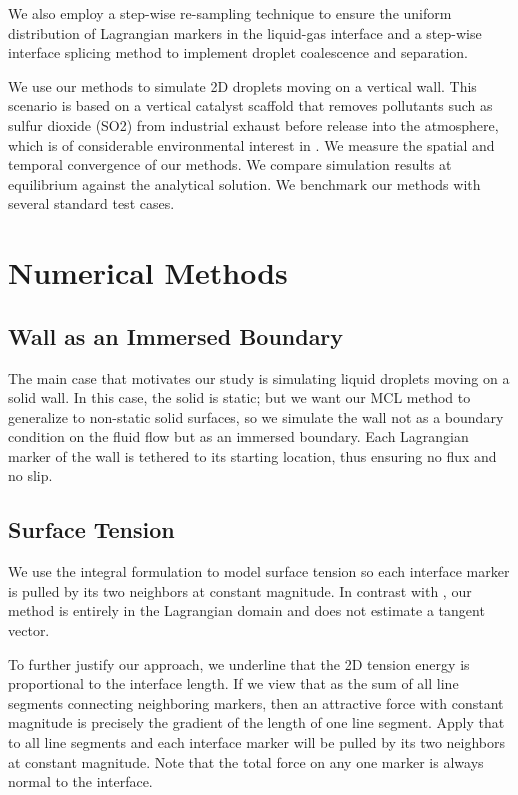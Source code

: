 \documentclass{jfm}
\newcommand{\daniel}[1]{\todo[inline,color=yellow!40]{Daniel: #1}}
\begin{document}
We also employ a step-wise re-sampling technique to ensure the uniform distribution of Lagrangian markers in the liquid-gas interface and a step-wise interface splicing method to implement droplet coalescence and separation. 

We use our methods to simulate 2D droplets moving on a vertical wall. This scenario is based on a vertical catalyst scaffold that removes pollutants such as sulfur dioxide (SO2) from industrial exhaust before release into the atmosphere, which is of considerable environmental interest in \cite{MPIreport2018}. We measure the spatial and temporal convergence of our methods. We compare simulation results at equilibrium against the analytical solution. We benchmark our methods with several standard test cases. 

\section {Numerical Methods}
\subsection{Wall as an Immersed Boundary} \label{subsec:wall}
The main case that motivates our study is simulating liquid droplets moving on a solid wall. In this case, the solid is static; but we want our MCL method to generalize to non-static solid surfaces, so we simulate the wall not as a boundary condition on the fluid flow but as an immersed boundary. Each Lagrangian marker of the wall is tethered to its starting location, thus ensuring no flux and no slip. 
\daniel{Actually, section \ref{sec:simulation} describes this better.}

\subsection{Surface Tension}
We use the integral formulation to model surface tension \cite{surface_tension_review} so each interface marker is pulled by its two neighbors at constant magnitude. In contrast with \cite{surface_tension_still_tangent_applied_to_segment}, our method is entirely in the Lagrangian domain and does not estimate a tangent vector. 

To further justify our approach, we underline that the 2D tension energy is proportional to the interface length. If we view that as the sum of all line segments connecting neighboring markers, then an attractive force with constant magnitude is precisely the gradient of the length of one line segment. Apply that to all line segments and each interface marker will be pulled by its two neighbors at constant magnitude. Note that the total force on any one marker is always normal to the interface. 
\end{document}
